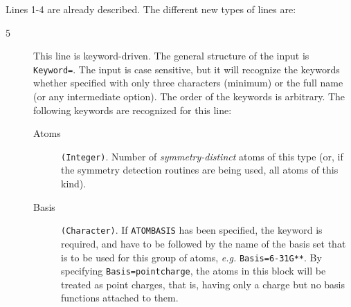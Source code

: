 Lines 1-4 are already described. The different new types of lines are:
\begin{description}
\item[5] This line is keyword-driven. The general structure of the input is
\verb|Keyword=|. The input is case sensitive, but it will recognize
the keywords whether specified with only three characters (minimum) or
the full name (or any intermediate option). The order of the keywords
is arbitrary. The following keywords are
recognized for this line:
\begin{description}
\item[Atoms] \verb|(Integer)|. Number of {\em
  symmetry-distinct} atoms of 
this type (or, if the symmetry detection routines are being used, all
atoms of this kind).
\item[Basis] \verb|(Character)|. If \verb|ATOMBASIS| has been specified,
  the keyword is required, and have to be followed by the name of the
  basis set that is to be used for this group of atoms, {\it e.g.\/}
  \verb|Basis=6-31G**|. By specifying
  \verb|Basis=pointcharge|, the
  atoms in this block will be treated as point charges, that is,
  having only a charge but no basis functions attached to
  them.


\end{description}
\end{description}
